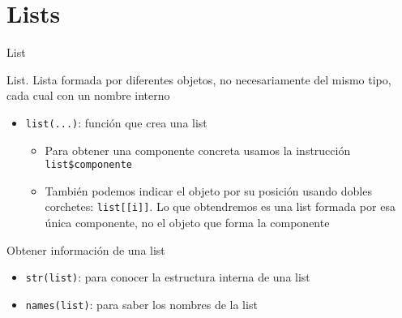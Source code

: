 \documentclass[
  ignorenonframetext,
]{beamer}
\providecommand{\tightlist}{%
  \setlength{\itemsep}{0pt}\setlength{\parskip}{0pt}}
\begin{document}
\hypertarget{lists}{%
\section{Lists}\label{lists}}

\begin{frame}[fragile]{List}
\protect\hypertarget{list}{}

List. Lista formada por diferentes objetos, no necesariamente del mismo
tipo, cada cual con un nombre interno

\begin{itemize}
\tightlist
\item
  \texttt{list(...)}: función que crea una list

  \begin{itemize}
  \tightlist
  \item
    Para obtener una componente concreta usamos la instrucción
    \texttt{list\$componente}
  \item
    También podemos indicar el objeto por su posición usando dobles
    corchetes: \texttt{list{[}{[}i{]}{]}}. Lo que obtendremos es una
    list formada por esa única componente, no el objeto que forma la
    componente
  \end{itemize}
\end{itemize}

\end{frame}

\begin{frame}[fragile]{Obtener información de una list}
\protect\hypertarget{obtener-informaciuxf3n-de-una-list}{}

\begin{itemize}
\tightlist
\item
  \texttt{str(list)}: para conocer la estructura interna de una list
\item
  \texttt{names(list)}: para saber los nombres de la list
\end{itemize}

\end{frame}
\end{document}
